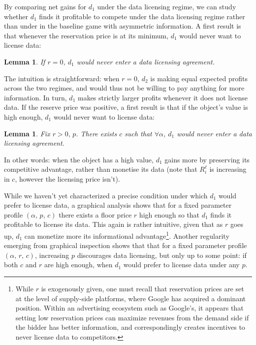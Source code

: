 \documentclass[11pt]{article}
\theoremstyle{plain}
\theoremstyle{definition}
\theoremstyle{plain}
\theoremstyle{plain}
\theoremstyle{plain}
\newtheorem{lem}[thm]{Lemma}
\theoremstyle{plain}
\numberwithin{equation}{section}
\begin{document}
\noindent By comparing net gains for $d_1$ under the data licensing regime, we can study whether $d_1$ finds it profitable to compete under the data licensing regime rather than under in the baseline game with asymmetric information. A first result is that whenever the reservation price is at its minimum, $d_1$ would never want to license data:

\begin{lem}
    If $r = 0$, $d_1$ would never enter a data licensing agreement.
\end{lem}

\noindent The intuition is straightforward: when $r=0$, $d_2$ is making equal expected profits across the two regimes, and would thus not be willing to pay anything for more information. In turn, $d_1$ makes strictly larger profits whenever it does not license data. If the reserve price was positive, a first result is that if the object's value is high enough, $d_1$ would never want to license data:

\begin{lem}
    Fix $r> 0, \, p$. There exists $c$ such that $\forall \alpha$, $d_1$ would never enter a data licensing agreement.
\end{lem}

\noindent In other words: when the object has a high value, $d_1$ gains more by preserving its competitive advantage, rather than monetise its data (note that $R_i^{\ell}$ is increasing in $c$, however the licensing price isn't). \par 
\vspace{2mm}

\noindent While we haven't yet characterized a precise condition under which $d_1$ would prefer to license data, a graphical analysis shows that for a fixed parameter profile $(\alpha, \, p, \, c)$ there exists a floor price $r$ high enough so that $d_1$ finds it profitable to license its data. This again is rather intuitive, given that as $r$ goes up, $d_1$ can monetize more its informational advantage\footnote{While $r$ is exogenously given, one must recall that reservation prices are set at the level of supply-side platforms, where Google has acquired a dominant position. Within an advertising ecosystem such as Google's, it appears that setting low reservation prices can maximize revenues from the demand side if the bidder has better information, and correspondingly creates incentives to never license data to competitors.}. Another regularity emerging from graphical inspection shows that that for a fixed parameter profile $(\alpha, \, r, \, c)$, increasing $p$ discourages data licensing, but only up to some point: if both $c$ and $r$ are high enough, when $d_1$ would prefer to license data under any $p$.
\end{document}
